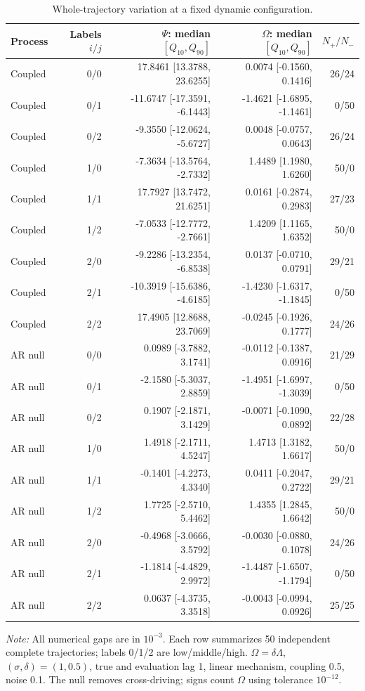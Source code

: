 \begin{table}[t]
\centering\color{red}
\caption{Whole-trajectory variation at a fixed dynamic configuration.}
\label{tab:temporal-variability}
\begin{tabular}{lrrrr}
\toprule
Process & Labels $i/j$ & $\Psi$: median $[Q_{10},Q_{90}]$ & $\Omega$: median $[Q_{10},Q_{90}]$ & $N_+/N_-$ \\
\midrule
Coupled & 0/0 & 17.8461 [13.3788, 23.6255] & 0.0074 [-0.1560, 0.1416] & 26/24 \\
Coupled & 0/1 & -11.6747 [-17.3591, -6.1443] & -1.4621 [-1.6895, -1.1461] & 0/50 \\
Coupled & 0/2 & -9.3550 [-12.0624, -5.6727] & 0.0048 [-0.0757, 0.0643] & 26/24 \\
Coupled & 1/0 & -7.3634 [-13.5764, -2.7332] & 1.4489 [1.1980, 1.6260] & 50/0 \\
Coupled & 1/1 & 17.7927 [13.7472, 21.6251] & 0.0161 [-0.2874, 0.2983] & 27/23 \\
Coupled & 1/2 & -7.0533 [-12.7772, -2.7661] & 1.4209 [1.1165, 1.6352] & 50/0 \\
Coupled & 2/0 & -9.2286 [-13.2354, -6.8538] & 0.0137 [-0.0710, 0.0791] & 29/21 \\
Coupled & 2/1 & -10.3919 [-15.6386, -4.6185] & -1.4230 [-1.6317, -1.1845] & 0/50 \\
Coupled & 2/2 & 17.4905 [12.8688, 23.7069] & -0.0245 [-0.1926, 0.1777] & 24/26 \\
AR null & 0/0 & 0.0989 [-3.7882, 3.1741] & -0.0112 [-0.1387, 0.0916] & 21/29 \\
AR null & 0/1 & -2.1580 [-5.3037, 2.8859] & -1.4951 [-1.6997, -1.3039] & 0/50 \\
AR null & 0/2 & 0.1907 [-2.1871, 3.1429] & -0.0071 [-0.1090, 0.0892] & 22/28 \\
AR null & 1/0 & 1.4918 [-2.1711, 4.5247] & 1.4713 [1.3182, 1.6617] & 50/0 \\
AR null & 1/1 & -0.1401 [-4.2273, 4.3340] & 0.0411 [-0.2047, 0.2722] & 29/21 \\
AR null & 1/2 & 1.7725 [-2.5710, 5.4462] & 1.4355 [1.2845, 1.6642] & 50/0 \\
AR null & 2/0 & -0.4968 [-3.0666, 3.5792] & -0.0030 [-0.0880, 0.1078] & 24/26 \\
AR null & 2/1 & -1.1814 [-4.4829, 2.9972] & -1.4487 [-1.6507, -1.1794] & 0/50 \\
AR null & 2/2 & 0.0637 [-4.3735, 3.3518] & -0.0043 [-0.0994, 0.0926] & 25/25 \\
\bottomrule
\end{tabular}
\par\vspace{0.4ex}\footnotesize\emph{Note:} All numerical gaps are in $10^{-3}$. Each row summarizes 50 independent complete trajectories; labels 0/1/2 are low/middle/high. $\Omega=\delta\Lambda$, $(\sigma,\delta)=(1,0.5)$, true and evaluation lag 1, linear mechanism, coupling 0.5, noise 0.1. The null removes cross-driving; signs count $\Omega$ using tolerance $10^{-12}$.
\end{table}
